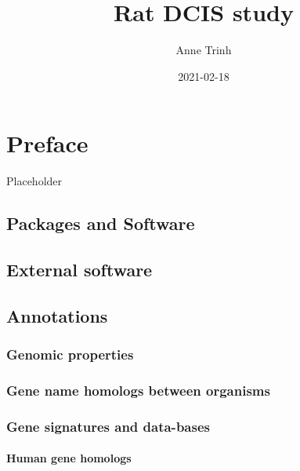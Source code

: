\documentclass[
]{book}
\title{Rat DCIS study}
\author{Anne Trinh}
\date{2021-02-18}
\begin{document}
\maketitle

{
\setcounter{tocdepth}{1}
\tableofcontents
}
\hypertarget{preface}{%
\chapter*{Preface}\label{preface}}

Placeholder

\hypertarget{packages-and-software}{%
\section{Packages and Software}\label{packages-and-software}}

\hypertarget{external-software}{%
\section{External software}\label{external-software}}

\hypertarget{annotations}{%
\section{Annotations}\label{annotations}}

\hypertarget{genomic-properties}{%
\subsection{Genomic properties}\label{genomic-properties}}

\hypertarget{gene-name-homologs-between-organisms}{%
\subsection{Gene name homologs between organisms}\label{gene-name-homologs-between-organisms}}

\hypertarget{gene-signatures-and-data-bases}{%
\subsection{Gene signatures and data-bases}\label{gene-signatures-and-data-bases}}

\hypertarget{human-gene-homologs}{%
\subsubsection{Human gene homologs}\label{human-gene-homologs}}
\end{document}
